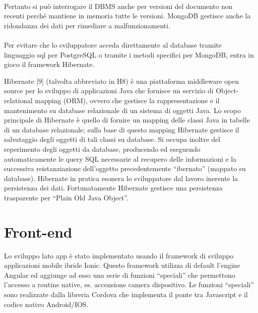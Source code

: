 \paragraph{}

Pertanto si può interrogare il DBMS anche per versioni del documento non recenti perché mantiene in memoria tutte le versioni.
MongoDB gestisce anche la ridondanza dei dati per rimediare a malfunzionamenti.
\paragraph{}

Per evitare che lo sviluppatore acceda direttamente al database tramite linguaggio sql per PostgreSQL o tramite i metodi specifici per MongoDB,
entra in gioco il framework Hibernate.

Hibernate [9] (talvolta abbreviato in H8) è una piattaforma middleware open source per lo sviluppo di applicazioni Java che fornisce un servizio di Object-relational mapping (ORM), ovvero che gestisce la rappresentazione e il mantenimento su database relazionale di un sistema di oggetti Java. Lo scopo principale di Hibernate è quello di fornire un mapping delle
classi Java in tabelle di un database relazionale; sulla base di questo
mapping Hibernate gestisce il salvataggio degli oggetti di tali classi su database. Si occupa inoltre del reperimento degli oggetti da database, producendo ed eseguendo automaticamente le query SQL necessarie al recupero delle informazioni e la successiva reistanziazione dell’oggetto precedentemente “ibernato” (mappato su database).
Hibernate in pratica esonera lo sviluppatore dal lavoro inerente la persistenza dei dati.
Fortunatamente Hibernate gestisce una persistenza trasparente per “Plain Old Java
Object”.


\section{Front-end}


Lo sviluppo lato app è stato implementato usando il framework di sviluppo applicazioni mobile ibride Ionic.
Questo framework utilizza di default l’engine Angular ed aggiunge ad esso una serie di funzioni “speciali” che permettono l’accesso a routine native, es. accensione camera dispositivo. Le funzioni “speciali” sono realizzate dalla libreria Cordova che implementa il ponte tra Javascript e il codice nativo Android/IOS.
\paragraph{}


